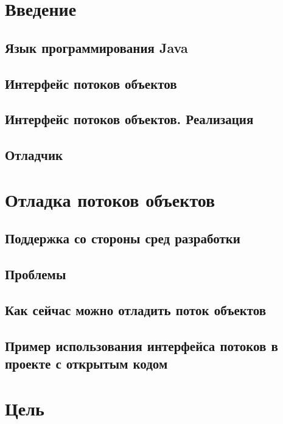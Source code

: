 
%
\section{Введение}
\subsection{Язык программирования Java}



\subsection{Интерфейс потоков объектов}

\subsection{Интерфейс потоков объектов. Реализация}




\subsection{Отладчик}



\section{Отладка потоков объектов}
\subsection{Поддержка со стороны сред разработки}

\subsection{Проблемы}

\subsection{Как сейчас можно отладить поток объектов}

\subsection{Пример использования интерфейса потоков в проекте с открытым кодом}


\section{Цель}

